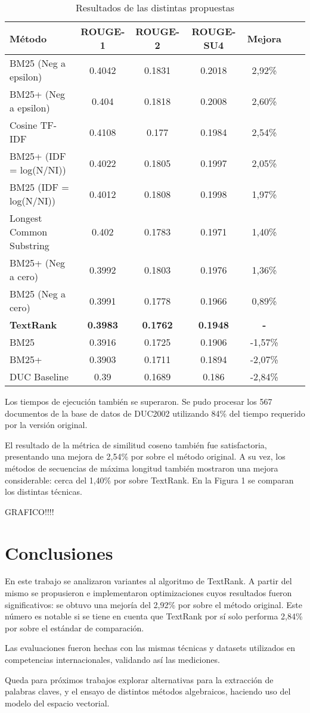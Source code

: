 \documentclass{llncs}
\begin{document}
\begin{table}
\caption{Resultados de las distintas propuestas}
\begin{center}
\begin{tabular}{l*{5}{c}r}
\hline
\rule{0pt}{12pt}
Método & ROUGE-1 & ROUGE-2 & ROUGE-SU4 & Mejora \\[2pt]
\hline\rule{0pt}{12pt}
BM25 (Neg a epsilon) & 0.4042 & 0.1831 & 0.2018 & 2,92\% \\
BM25+ (Neg a epsilon) & 0.404 & 0.1818 & 0.2008 & 2,60\% \\
Cosine TF-IDF & 0.4108 & 0.177 & 0.1984 & 2,54\% \\
BM25+ (IDF = log(N/NI)) & 0.4022 & 0.1805 & 0.1997 & 2,05\% \\ 
BM25 (IDF = log(N/NI)) & 0.4012 & 0.1808 & 0.1998 & 1,97\% \\ 
Longest Common Substring & 0.402 & 0.1783 & 0.1971 & 1,40\% \\
BM25+ (Neg a cero) & 0.3992 & 0.1803 & 0.1976 & 1,36\% \\ 
BM25 (Neg a cero) & 0.3991 & 0.1778 & 0.1966 & 0,89\% \\
\textbf{TextRank} & \textbf{0.3983} & \textbf{0.1762} & \textbf{0.1948} & \textbf{-}\\
BM25 & 0.3916 & 0.1725 & 0.1906 & -1,57\% \\
BM25+ & 0.3903 & 0.1711 & 0.1894 & -2,07\% \\
DUC Baseline & 0.39 & 0.1689 & 0.186 & -2,84\% \\ [2pt]
\hline
\end{tabular}
\end{center}
\end{table}


Los tiempos de ejecución también se superaron. Se pudo procesar los 567 documentos de la base de datos de DUC2002 utilizando 84\% del tiempo requerido por la versión original.

El resultado de la métrica de similitud coseno también fue satisfactoria, presentando una mejora de 2,54\% por sobre el método original. A su vez, los métodos de secuencias de máxima longitud también mostraron una mejora considerable: cerca del 1,40\% por sobre TextRank. En la Figura 1 se comparan los distintas técnicas.

GRAFICO!!!!

\section{Conclusiones}
En este trabajo se analizaron variantes al algoritmo de TextRank. A partir del mismo se propusieron e implementaron optimizaciones cuyos resultados fueron significativos: se obtuvo una mejoría del 2,92\% por sobre el método original. Este número es notable si se tiene en cuenta que TextRank por sí solo performa 2,84\% por sobre el estándar de comparación.

Las evaluaciones fueron hechas con las mismas técnicas y datasets utilizados en competencias internacionales, validando así las mediciones.

Queda para próximos trabajos explorar alternativas para la extracción de palabras claves, y el ensayo de distintos métodos algebraicos, haciendo uso del modelo del espacio vectorial.
\end{document}
